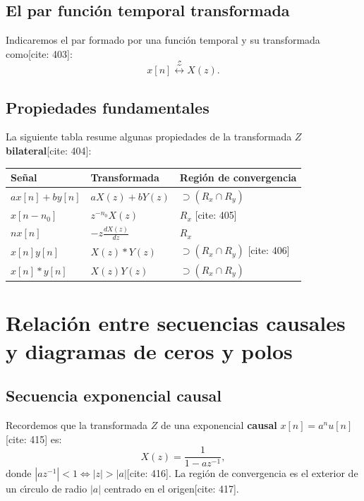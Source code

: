 \documentclass[11pt,a4paper,openany]{book}
\begin{document}
\subsection{El par funci\'{o}n temporal transformada}
Indicaremos el par formado por una funci\'{o}n temporal y su transformada como[cite: 403]:
\begin{equation}
	x[n] \stackrel{\mathcal{Z}}{\longleftrightarrow} X(z).
\end{equation}

\subsection{Propiedades fundamentales}

La siguiente tabla resume algunas propiedades de la transformada $Z$ \textbf{bilateral}[cite: 404]:
\begin{center}
	\begin{tabular}{lll}
		\textbf{Se\~{n}al} & \textbf{Transformada} & \textbf{Regi\'{o}n de convergencia} \\ 
		\hline
		$a x[n] + b y[n]$ & $a X(z) + b Y(z)$ & $\supset (R_{x} \cap R_{y})$ \\ 
		$x[n-n_{0}]$ & $z^{-n_{0}} X(z)$ & $R_{x}$ [cite: 405] \\ 
		$n x[n]$ & $-z \frac{dX(z)}{dz}$ & $R_{x}$ \\ 
		$x[n] y[n]$ & $X(z) * Y(z)$ & $\supset (R_{x} \cap R_{y})$ [cite: 406] \\ 
		$x[n] * y[n]$ & $X(z) Y(z)$ & $\supset (R_{x} \cap R_{y})$
	\end{tabular}
\end{center}

\section{Relaci\'{o}n entre secuencias causales y diagramas de ceros y polos}

\subsection{Secuencia exponencial causal}
Recordemos que la transformada $Z$ de una exponencial \textbf{causal} $x[n] = a^{n} u[n]$ [cite: 415] es:
\begin{equation}
	X(z) = \frac{1}{1-a z^{-1}},
\end{equation}
donde $|a z^{-1}| < 1 \Leftrightarrow |z| > |a|$[cite: 416]. La regi\'{o}n de convergencia es el exterior de un c\'{\i}rculo de radio $|a|$ centrado en el origen[cite: 417].
\end{document}
